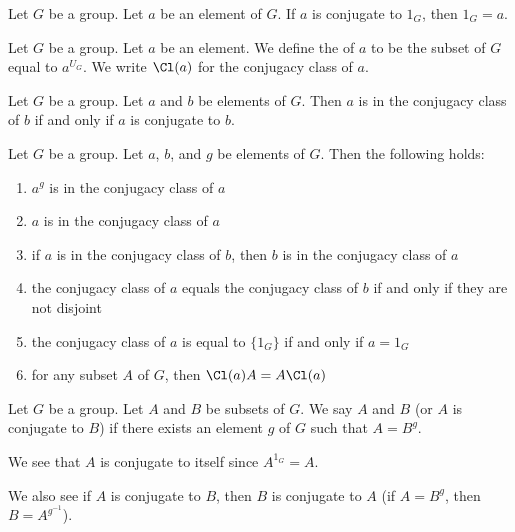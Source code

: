 \begin{theorem}
Let $G$ be a group. Let $a$ be an element of $G$.
If $a$ is conjugate to $1_{G}$, then $1_{G}=a$.
\end{theorem}

\begin{definition}
Let $G$ be a group. Let $a$ be an element.
We define the  of $a$ to be the subset of $G$
equal to $a^{U_{G}}$. We write $\Cl(a)$ for the conjugacy class of $a$.
\end{definition}

\begin{theorem}
Let $G$ be a group. Let $a$ and $b$ be elements of $G$.
Then $a$ is in the conjugacy class of $b$ if and only if $a$ is
conjugate to $b$.
\end{theorem}

\begin{theorem}
Let $G$ be a group. Let $a$, $b$, and $g$ be elements of $G$.
Then the following holds:
\begin{enumerate}
\item{} $a^{g}$ is in the conjugacy class of $a$
\item{} $a$ is in the conjugacy class of $a$
\item{} if $a$ is in the conjugacy class of $b$, then $b$
  is in the conjugacy class of $a$
\item{} the conjugacy class of $a$ equals the conjugacy
  class of $b$ if and only if they are not disjoint
\item{} the conjugacy class of $a$ is equal to
  $\{1_{G}\}$ if and only if $a=1_{G}$
\item{} for any subset $A$ of $G$, then $\Cl(a)A=A\Cl(a)$
\end{enumerate}
\end{theorem}

\begin{definition}
Let $G$ be a group. Let $A$ and $B$ be subsets of $G$.
We say $A$ and $B$  (or $A$ is conjugate to $B$)
if there exists an element $g$ of $G$ such that $A=B^{g}$.

We see that $A$ is conjugate to itself since $A^{1_{G}}=A$.

We also see if $A$ is conjugate to $B$, then $B$ is conjugate to $A$
(if $A=B^{g}$, then $B=A^{g^{-1}}$).
\end{definition}

